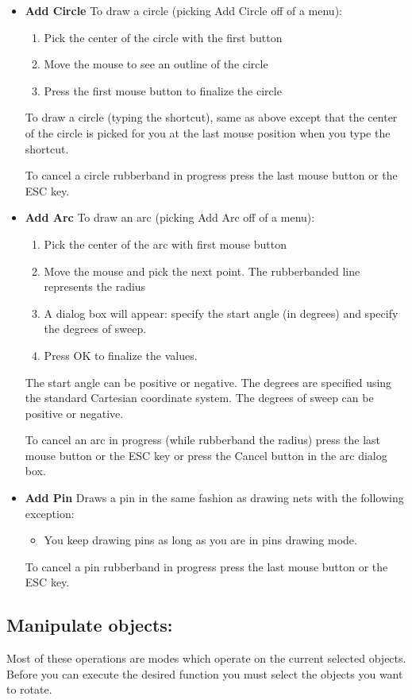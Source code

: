 \documentclass{article}
\begin{document}
\begin{itemize}
\item {\bf Add Circle} To draw a circle (picking Add Circle off of a
  menu):
\begin{enumerate}
\item Pick the center of the circle with the first button
\item Move the mouse to see an outline of the circle
\item Press the first mouse button to finalize the circle
\end{enumerate}

To draw a circle (typing the shortcut), same as above except that the
center of the circle is picked for you at the last mouse position when
you type the shortcut.

To cancel a circle rubberband in progress press the last mouse button
or the ESC key.

\item {\bf Add Arc} To draw an arc (picking Add Arc off of a menu):
\begin{enumerate}
\item Pick the center of the arc with first mouse button
\item Move the mouse and pick the next point.  The rubberbanded line
  represents the radius
\item A dialog box will appear: specify the start angle (in degrees)
  and specify the degrees of sweep.
\item Press OK to finalize the values.
\end{enumerate}
The start angle can be positive or negative.  The degrees are
specified using the standard Cartesian coordinate system.  The degrees
of sweep can be positive or negative.

To cancel an arc in progress (while rubberband the radius) press the
last mouse button or the ESC key or press the Cancel button in the arc
dialog box.

\item {\bf Add Pin} Draws a pin in the same fashion as drawing nets
  with the following exception:
\begin{itemize}  
\item You keep drawing pins as long as you are in pins drawing mode.
  \end{itemize}
  To cancel a pin rubberband in progress press the last mouse button
  or the ESC key.
\end{itemize}

\subsection{Manipulate objects:}
Most of these operations are modes which operate on the current
selected objects.  Before you can execute the desired function you
must select the objects you want to rotate.
\end{document}
